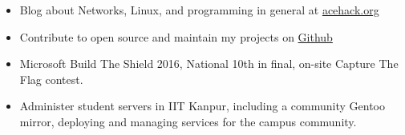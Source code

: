 
{\fontsize{11pt}{1em}\bodyfontlight\upshape\color{text}
\begin{itemize}
  \item Blog about Networks, Linux, and programming in
    general at \href{http://acehack.org}{acehack.org}
  \item Contribute to open source and maintain my projects on
    \href{https://github.com/sakshamsharma}{Github}
  \item Microsoft Build The Shield 2016, National 10th in final,
    on-site Capture The Flag contest.
  \item Administer student servers in IIT Kanpur, including a community Gentoo
    mirror, deploying and managing services for the campus community.
\end{itemize}
}

